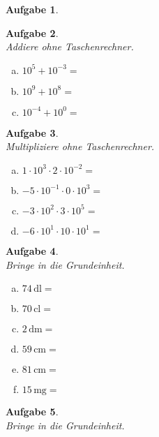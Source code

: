 \documentclass[12pt,fleqn]{article}
\theoremstyle{aufg}
\newtheorem{aufgabe}{Aufgabe}
\theoremstyle{bsp}
\begin{document}
\begin{flushleft}
\begin{aufgabe}
\begin{multicols}{3}
\end{multicols} 
\end{aufgabe} 
\begin{aufgabe} ~ \\ 
Addiere ohne Taschenrechner. \\ 
\begin{multicols}{3} 
\begin{enumerate}[a)] 
\item 
$10^{5}+10^{-3}=$
\item 
$10^{9}+10^{8}=$
\item 
$10^{-4}+10^{0}=$
\end{enumerate} 
\end{multicols} 
\end{aufgabe} 
\begin{aufgabe} ~ \\ 
Multipliziere ohne Taschenrechner. \\ 
\begin{multicols}{2} 
\begin{enumerate}[a)] 
\item 
$1\cdot10^{3}\cdot2\cdot10^{-2}=$
\item 
$-5\cdot10^{-1}\cdot0\cdot10^{3}=$
\item 
$-3\cdot10^{2}\cdot3\cdot10^{5}=$
\item 
$-6\cdot10^{1}\cdot10\cdot10^{1}=$
\end{enumerate} 
\end{multicols} 
\end{aufgabe} 
\begin{aufgabe} ~ \\ 
Bringe in die Grundeinheit. \\ 
\begin{multicols}{3} 
\begin{enumerate}[a)] 
\item 
$74\,\mathrm{dl}=$
\item 
$70\,\mathrm{cl}=$
\item 
$2\,\mathrm{dm}=$
\item 
$59\,\mathrm{cm}=$
\item 
$81\,\mathrm{cm}=$
\item 
$15\,\mathrm{mg}=$
\end{enumerate} 
\end{multicols} 
\end{aufgabe} 
\begin{aufgabe} ~ \\ 
Bringe in die Grundeinheit. \\ 

\end{aufgabe}
\end{flushleft}
\end{document}

